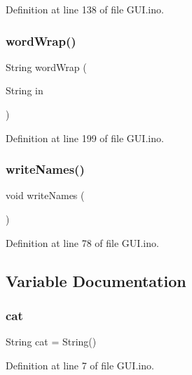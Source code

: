 Definition at line 138 of file G\+U\+I.\+ino.

\mbox{\label{_g_u_i_8ino_ab945e0c8dbab7335f8dab9a01363277e}} 
\subsubsection{\texorpdfstring{wordWrap()}{wordWrap()}}
{\footnotesize\ttfamily String word\+Wrap (\begin{DoxyParamCaption}\item[{String}]{in }\end{DoxyParamCaption})}



Definition at line 199 of file G\+U\+I.\+ino.

\mbox{\label{_g_u_i_8ino_aa1bc5d27389d6a706f36fd90fb5e9fde}} 
\subsubsection{\texorpdfstring{writeNames()}{writeNames()}}
{\footnotesize\ttfamily void write\+Names (\begin{DoxyParamCaption}{ }\end{DoxyParamCaption})}



Definition at line 78 of file G\+U\+I.\+ino.



\subsection{Variable Documentation}
\mbox{\label{_g_u_i_8ino_aa06b06b459c7abb28f43da864fd7d6d2}} 
\subsubsection{\texorpdfstring{cat}{cat}}
{\footnotesize\ttfamily String cat = String()}



Definition at line 7 of file G\+U\+I.\+ino.

\mbox{\label{_g_u_i_8ino_aef0f17f605f3193c781b789597ead6de}} 
